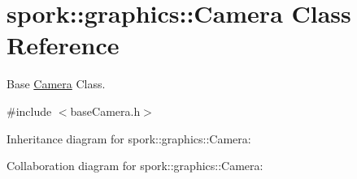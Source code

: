\hypertarget{classspork_1_1graphics_1_1_camera}{}\section{spork\+:\+:graphics\+:\+:Camera Class Reference}
\label{classspork_1_1graphics_1_1_camera}


Base \hyperlink{classspork_1_1graphics_1_1_camera}{Camera} Class.  




{\ttfamily \#include $<$base\+Camera.\+h$>$}



Inheritance diagram for spork\+:\+:graphics\+:\+:Camera\+:


Collaboration diagram for spork\+:\+:graphics\+:\+:Camera\+:
